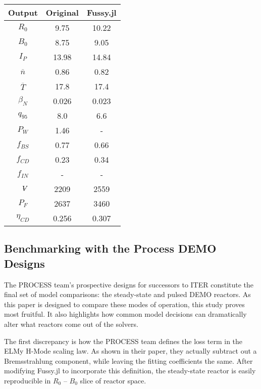 \begin{table}[h!]
\begin{subtable}[t]{0.5\textwidth}
\begin{tabular}{ c|c|c }
Output           & Original         & Fussy.jl        \\
\hline
$R_{0}$          & 9.75             & 10.22           \\
$B_{0}$          & 8.75             & 9.05           \\
$I_{P}$          & 13.98            & 14.84           \\
$\overline n$    & 0.86             & 0.82          \\
$\overline T$    & 17.8             & 17.4           \\
$\beta_{N}$       & 0.026            & 0.023          \\
$q_{95}$         & 8.0              & 6.6           \\
$P_{W}$          & 1.46             & -            \\
$f_{BS}$         & 0.77             & 0.66           \\
$f_{CD}$         & 0.23             & 0.34           \\
$f_{IN}$         & -              & -             \\
$\volume$         & 2209           & 2559          \\
$P_{F}$          & 2637           & 3460          \\
$\eta_{CD}$      & 0.256            & 0.307           \\

\end{tabular}
\end{subtable}
\hfill
\hfill
\end{table}

\newpage

\subsection{Benchmarking with the Process DEMO Designs}

The PROCESS team's prospective designs for successors to ITER constitute the final set of model comparisons: the steady-state and pulsed DEMO reactors. As this paper is designed to compare these modes of operation, this study proves most fruitful. It also highlights how common model decisions can dramatically alter what reactors come out of the solvers.

The first discrepancy is how the PROCESS team defines the loss term in the ELMy H-Mode scaling law. As shown in their paper, they actually subtract out a Bremsstrahlung component, while leaving the fitting coefficients the same. \cite{process} After modifying Fussy.jl to incorporate this definition, the steady-state reactor is easily reproducible in $R_0$ -- $B_0$ slice of reactor space.

